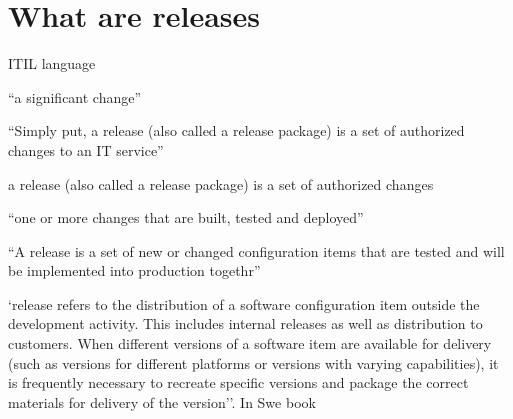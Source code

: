 % 
% 
% 
%   
% 
% 
% 
% 
% 
% 
% 
%     
%     
% 
%     
%     
%     
% 
% 
% 
% 
% 
% 
% 
% 
% 
% 
% 
%  
 
 
 
 
 
 \section{What are releases} 
 
 ITIL language 

 
 
 ``a significant change'' \citep{Bon2011}
 
 
 ``Simply put, a release (also called a release package) is a set of authorized changes to an IT service'' 
 
 a release (also called a release package) is a set of authorized changes \citep{GovernmentCommerce2005}
 
 
 ``one or more changes that are built, tested and deployed'' \citep{Davies2016}
 
 
 ``A release is a set of new or changed configuration items that are tested and will be implemented into production togethr''  
 
 
 `release refers  to  the  distribution  of  a  software  configuration  item  outside the development activity. This  includes  internal 
releases as well as distribution to customers. When  different versions of a software item are available 
for  delivery  (such  as  versions  for  different  platforms  or  versions  with  varying  capabilities),  it  is  
frequently necessary to recreate specific versions 
and  package  the  correct  materials  for  delivery  of  
the version''.  In Swe book

